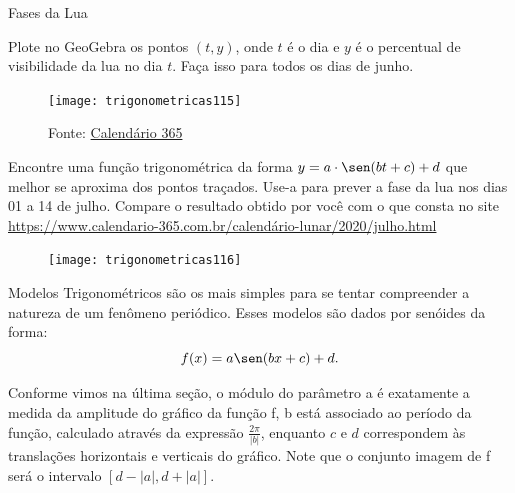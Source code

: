 \clearpage
\begin{task}{Fases da Lua}

Plote no GeoGebra os pontos $(t,y)$, onde $t$ é o dia e $y$ é o percentual de visibilidade da lua no dia $t$. Faça isso para todos os dias de junho.

\begin{figure}[H]
\centering

\texttt{[image: trigonometricas115]}
\caption{Fonte: \href{https://www.calendario-365.com.br/calend\%C3\%A1rio-lunar/2020/junho.html}{Calendário 365}}
\label{}
\end{figure}

Encontre uma função trigonométrica da forma $y = a\cdot\sen(bt+c) +d$ que melhor se aproxima dos pontos traçados. Use-a para prever a fase da lua nos dias 01 a 14 de julho. Compare o resultado obtido por você com o que consta no site \url{https://www.calendario-365.com.br/calendário-lunar/2020/julho.html}

\begin{figure}[H]
\centering

\texttt{[image: trigonometricas116]}
\end{figure}
\end{task}


Modelos Trigonométricos são os mais simples para se tentar compreender a natureza de um fenômeno periódico. Esses modelos são dados por senóides da forma:
\begin{equation*}
f(x)= a\sen(bx+c) + d.
\end{equation*}

Conforme vimos na última seção, o módulo do parâmetro a é exatamente a medida da amplitude do gráfico da função f, b está associado ao período da função, calculado através da expressão $\frac{2\pi}{|b|}$, enquanto $c$ e $d$ correspondem às translações horizontais e verticais do gráfico. Note que o conjunto imagem de f será o intervalo $[d -|a|, d+|a|]$.


